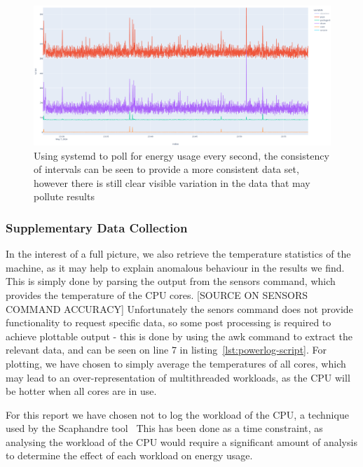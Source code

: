 \begin{figure}[H]
    \centering
    \includegraphics[width=15cm]{figures/introduction/systemd_energy_polling}
    \caption{Using systemd to poll for energy usage every second, the consistency of intervals can be seen to provide a
    more consistent data set, however there is still clear visible variation in the data that may pollute results}
    \label{fig:systemd_energy_polling}
\end{figure}



\subsubsection{Supplementary Data Collection}
In the interest of a full picture, we also retrieve the temperature statistics of the machine, as it may help to
explain anomalous behaviour in the results we find.
This is simply done by parsing the output from the sensors command, which provides the temperature of the CPU cores.
[SOURCE ON SENSORS COMMAND ACCURACY]
Unfortunately the senors command does not provide functionality to request specific data, so some post processing is
required to achieve plottable output - this is done by using the awk command to extract the relevant data, and can be
seen on line 7 in listing~\ref{lst:powerlog-script}.
For plotting, we have chosen to simply average the temperatures of all cores, which may lead to an over-representation
of multithreaded workloads, as the CPU will be hotter when all cores are in use.

For this report we have chosen not to log the workload of the CPU, a technique used by the Scaphandre tool~\cite{ScaphandrePowerConsumption}
This has been done as a time constraint, as analysing the workload of the CPU would require a significant amount of
analysis to determine the effect of each workload on energy usage.


